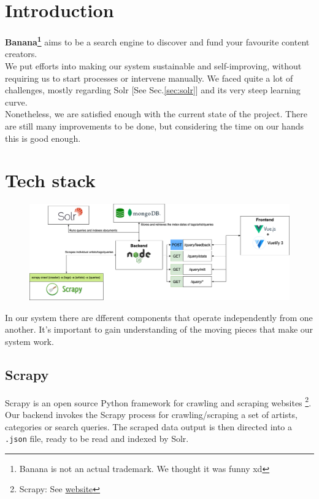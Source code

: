 \documentclass[tikz,14pt]{article}
\newcommand\sitename{Banana\texttrademark}
\begin{document}
\section{Introduction} \label{sec:intro}
\textbf{\sitename\footnote{Banana is not an actual trademark. We thought it was funny xd}} aims to be a search engine to discover and fund your favourite content creators.\\
We put efforts into making our system sustainable and self-improving, without requiring us to start processes or intervene manually. We faced quite a lot of challenges, mostly regarding Solr [See Sec.\ref{sec:solr}] and its very steep learning curve.\\
Nonetheless, we are satisfied enough with the current state of the project. There are still many improvements to be done, but considering the time on our hands this is good enough.\\


\section{Tech stack} \label{sec:stack}
\begin{figure}[h!]
    \includegraphics*[width=\linewidth]{fig/StackDiagram.png}
\end{figure}
In our system there are dfferent components that operate independently from one another. It's important to gain understanding of the moving pieces that make our system work.

\subsection{Scrapy} \label{sec:scrapy}
Scrapy is an open source Python framework for crawling and scraping websites \footnote{Scrapy: See \href{https://scrapy.org}{website}}. Our backend invokes the Scrapy process for crawling/scraping a set of artists, categories or search queries. The scraped data output is then directed into a \verb|.json| file, ready to be read and indexed by Solr.
\end{document}
